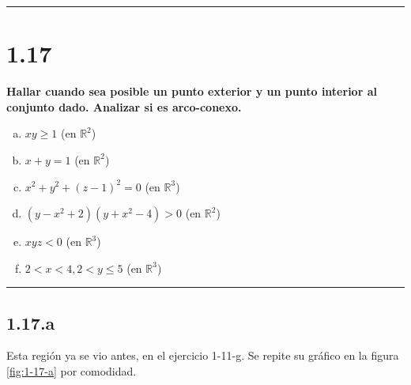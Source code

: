 \documentclass{article}
\renewcommand{\Bbb}{\mathbb}
\begin{document}
\hrule
\vspace{10 pt}

\section*{1.17}
\label{sec:1.17}

\textbf{Hallar cuando sea posible un punto exterior y un punto interior al conjunto dado. Analizar si es arco-conexo.} 

\begin{enumerate}[(a)]
\bfseries
\item $xy \geq 1$ (en $\Bbb R^2$)

\item $x + y = 1$ (en $\Bbb R^2$)

\item $x^2 + y^2 + (z-1)^2 = 0$ (en $\Bbb R^3$)

\item $(y - x^2 + 2) (y + x^2 -4) > 0$ (en $\Bbb R^2$)

\item $xyz < 0$ (en $\Bbb R^3$)

\item $2 < x <4, 2 < y \leq 5$ (en $\Bbb R^3$)
\end{enumerate}
\hrule

\subsection*{1.17.a}
\label{subsec:1.17.a}

Esta región ya se vio antes, en el ejercicio 1-11-g. Se repite su gráfico en la figura \ref{fig:1-17-a} por comodidad.
\end{document}
